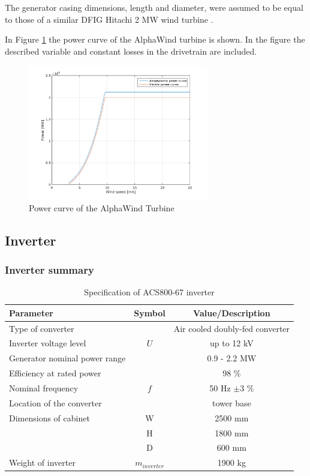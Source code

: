 The generator casing dimensions, length and diameter, were assumed to be equal to those of a similar DFIG Hitachi 2 MW wind turbine \cite{hitachi}.

In Figure \ref{fig:power_curve} the power curve of the AlphaWind turbine is shown. In the figure the described variable and constant losses in the drivetrain are included.

\begin{figure}[H]
\centering
\includegraphics[width=0.7\textwidth]{Images/power_curve_losses.png} 
\caption{Power curve of the AlphaWind Turbine}
\label{fig:power_curve}
\end{figure}


\subsection{Inverter}

\subsubsection{Inverter summary}

\begin{table}[h]
\centering
\caption{Specification of ACS800-67 inverter}
\label{tab:inverter}
\begin{tabular}{ |l|c|c|} 
\hline
\textbf{Parameter} & Symbol & \textbf{Value/Description} \\ 
\hline
Type of converter & & Air cooled doubly-fed converter \\
\hline
Inverter voltage level & $U$ & up to 12 kV\\
\hline
Generator nominal power range & & 0.9 - 2.2 MW \\
\hline
Efficiency at rated power & & 98 \% \\ 
\hline
Nominal frequency & $f$ & 50 Hz $\pm 3$ \% \\
\hline
Location of the converter & & tower base  \\ 
\hline
Dimensions of cabinet & W & 2500 mm \\
\hline
& H & 1800 mm \\
\hline
& D & 600 mm \\
\hline
Weight of inverter & $m_{inverter}$ & 1900 kg \\
\hline
\end{tabular} \\
\end{table}


